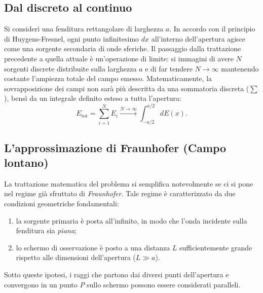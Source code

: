 \documentclass[a4paper,11pt]{report}
\begin{document}
\subsection{Dal discreto al continuo}
Si consideri una fenditura rettangolare di larghezza $a$. In accordo con il principio di Huygens-Fresnel, ogni punto infinitesimo $dx$ all'interno dell'apertura agisce come una sorgente secondaria di onde sferiche.
Il passaggio dalla trattazione precedente a quella attuale è un'operazione di limite: si immagini di avere $N$ sorgenti discrete distribuite sulla larghezza $a$ e di far tendere $N \to \infty$ mantenendo costante l'ampiezza totale del campo emesso.
Matematicamente, la sovrapposizione dei campi non sarà più descritta da una sommatoria discreta ($\sum$), bensì da un integrale definito esteso a tutta l'apertura:
\begin{equation}
    E_{\text{tot}} = \sum_{i=1}^N E_i \xrightarrow{N\to\infty} \int_{-a/2}^{a/2} dE(x).
\end{equation}

\subsection{L'approssimazione di Fraunhofer (Campo lontano)}
La trattazione matematica del problema si semplifica notevolmente se ci si pone nel regime già sfruttato di \textit{Fraunhofer}. Tale regime è caratterizzato da due condizioni geometriche fondamentali:
\begin{enumerate}
    \item la sorgente primaria è posta all'infinito, in modo che l'onda incidente sulla fenditura sia \textit{piana};
    \item lo schermo di osservazione è posto a una distanza $L$ sufficientemente grande rispetto alle dimensioni dell'apertura ($L \gg a$).
\end{enumerate}
Sotto queste ipotesi, i raggi che partono dai diversi punti dell'apertura e convergono in un punto $P$ sullo schermo possono essere considerati paralleli.
\end{document}

